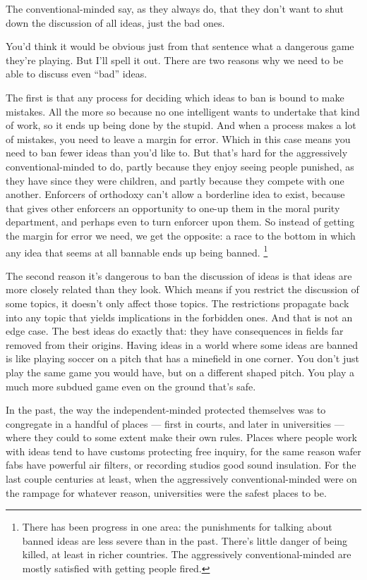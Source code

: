 \documentclass[12pt]{book}
\begin{document}
The conventional-minded say, as they always do, that they don't want to
shut down the discussion of all ideas, just the bad ones.

You'd think it would be obvious just from that sentence what a dangerous
game they're playing. But I'll spell it out. There are two reasons why
we need to be able to discuss even ``bad'' ideas.

The first is that any process for deciding which ideas to ban is bound
to make mistakes. All the more so because no one intelligent wants to
undertake that kind of work, so it ends up being done by the stupid. And
when a process makes a lot of mistakes, you need to leave a margin for
error. Which in this case means you need to ban fewer ideas than you'd
like to. But that's hard for the aggressively conventional-minded to do,
partly because they enjoy seeing people punished, as they have since
they were children, and partly because they compete with one another.
Enforcers of orthodoxy can't allow a borderline idea to exist, because
that gives other enforcers an opportunity to one-up them in the moral
purity department, and perhaps even to turn enforcer upon them. So
instead of getting the margin for error we need, we get the opposite: a
race to the bottom in which any idea that seems at all bannable ends up
being banned. \footnote{There has been progress in one area: the punishments for talking
about banned ideas are less severe than in the past. There's little
danger of being killed, at least in richer countries. The aggressively
conventional-minded are mostly satisfied with getting people fired.}

The second reason it's dangerous to ban the discussion of ideas is that
ideas are more closely related than they look. Which means if you
restrict the discussion of some topics, it doesn't only affect those
topics. The restrictions propagate back into any topic that yields
implications in the forbidden ones. And that is not an edge case. The
best ideas do exactly that: they have consequences in fields far removed
from their origins. Having ideas in a world where some ideas are banned
is like playing soccer on a pitch that has a minefield in one corner.
You don't just play the same game you would have, but on a different
shaped pitch. You play a much more subdued game even on the ground
that's safe.

In the past, the way the independent-minded protected themselves was to
congregate in a handful of places --- first in courts, and later in
universities --- where they could to some extent make their own rules.
Places where people work with ideas tend to have customs protecting free
inquiry, for the same reason wafer fabs have powerful air filters, or
recording studios good sound insulation. For the last couple centuries
at least, when the aggressively conventional-minded were on the rampage
for whatever reason, universities were the safest places to be.
\end{document}

